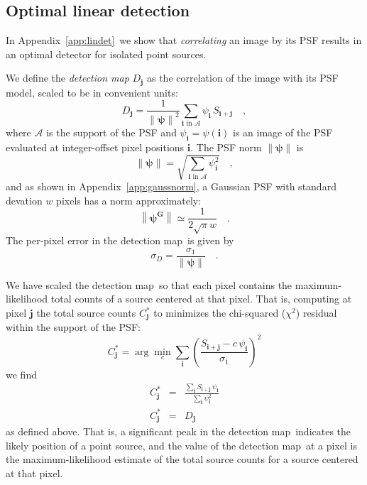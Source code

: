\documentclass[letterpaper,preprint]{aastex}
\newcommand{\appref}[1]{\mbox{Appendix~\ref{#1}}}
\newcommand{\detmap}{detection map}
\newcommand{\psf}{\psi}
\newcommand{\psfat}[1]{\psf_{#1}}
\newcommand{\psfnorm}{\norm{\bm{\psf}}}
\newcommand{\snr}[1]{\mathbb{SN}(#1)}
\newcommand{\norm}[1]{\left\lVert #1 \right\rVert}
\newcommand{\psfw}{w}
\renewcommand{\vec}[1]{\boldsymbol{#1}}
\newcommand{\ivec}{\vec{i}}
\newcommand{\jvec}{\vec{j}}
\newcommand{\kvec}{\vec{k}}
\newcommand{\iina}{\ivec \,\, \mathrm{in} \,\, \mathcal{A}}
\begin{document}


\subsection{Optimal linear detection}

In \appref{app:lindet}\ we show that \emph{correlating} an image by
its PSF results in an optimal detector for isolated point sources.

We define the \emph{\detmap} $D_{\jvec}$ as the correlation of
the image with its PSF model, scaled to be in convenient units:
\begin{equation}
D_{\jvec} = \frac{1}{\psfnorm^2} \sum_{\iina} \psfat{\ivec} \, S_{\ivec + \jvec} \quad ,
\label{eq:detmap}
\end{equation}
where $\mathcal{A}$ is the support of the PSF and
$\psfat{\ivec} = \psf(\ivec)$ is an image of the PSF evaluated at
integer-offset pixel positions $\ivec$.  The PSF norm $\psfnorm$ is
\begin{equation}
\psfnorm = \sqrt{\sum_{\iina} \psfat{\ivec}^2} \quad ,
\end{equation}
and as shown in \appref{app:gaussnorm}, a Gaussian PSF with standard
devation $\psfw$ pixels has a norm approximately:
\begin{equation}
  \norm{\bm{\psf^G}} \simeq \frac{1}{2 \sqrt{\pi} \psfw} \quad .
\end{equation}
The per-pixel error in the \detmap\ is given by
\begin{equation}
\sigma_{D} = \frac{\sigma_1}{\psfnorm} \quad .
\end{equation}


We have scaled the \detmap\ so that each pixel contains the
maximum-likelihood total counts of a source centered at that pixel.
That is, computing at pixel $\jvec$ the total source counts
$C^{\ast}_{\jvec}$ to minimizes the chi-squared ($\chi^2$) residual
within the support of the PSF:
\begin{equation}
  C^{\ast}_{\jvec} = \arg\min_{c} \sum_{\ivec} \left( \frac{S_{\ivec+\jvec} - c \, \psi_{\ivec}}{\sigma_1} \right)^2
\end{equation}
we find
\begin{eqnarray}
  C^{\ast}_{\jvec} &=& \frac{\sum_{\ivec} S_{\ivec+\jvec} \, \psi_{\ivec}}{\sum_{\ivec} \psi_{\ivec}^2}
  \\
  C^{\ast}_{\jvec} &=& D_{\jvec} %
\end{eqnarray}
as defined above.
%
That is, a significant peak in the \detmap\ indicates the likely
position of a point source, and the value of the \detmap\ at a pixel
is the maximum-likelihood estimate of the total source counts for a
source centered at that pixel.
\end{document}
